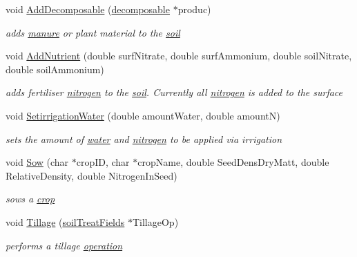 \begin{DoxyCompactItemize}
void \hyperlink{classpatch_interface_class_a5477552c0a1821f3f40e0bb3c96c7f8a}{AddDecomposable} (\hyperlink{classdecomposable}{decomposable} $\ast$produc)
\begin{DoxyCompactList}\small\item\em adds \hyperlink{classmanure}{manure} or plant material to the \hyperlink{classsoil}{soil} \item\end{DoxyCompactList}\item 
void \hyperlink{classpatch_interface_class_a9d183a51a7e9855ea13223c52b2ea3da}{AddNutrient} (double surfNitrate, double surfAmmonium, double soilNitrate, double soilAmmonium)
\begin{DoxyCompactList}\small\item\em adds fertiliser \hyperlink{classnitrogen}{nitrogen} to the \hyperlink{classsoil}{soil}. Currently all \hyperlink{classnitrogen}{nitrogen} is added to the surface \item\end{DoxyCompactList}\item 
void \hyperlink{classpatch_interface_class_a5f6d5f6deb20dd2acc8b39f581312541}{SetirrigationWater} (double amountWater, double amountN)
\begin{DoxyCompactList}\small\item\em sets the amount of \hyperlink{classwater}{water} and \hyperlink{classnitrogen}{nitrogen} to be applied via irrigation \item\end{DoxyCompactList}\item 
void \hyperlink{classpatch_interface_class_a1d4ab5a278d6663260d75d2c3c7ddb6b}{Sow} (char $\ast$cropID, char $\ast$cropName, double SeedDensDryMatt, double RelativeDensity, double NitrogenInSeed)
\begin{DoxyCompactList}\small\item\em sows a \hyperlink{classcrop}{crop} \item\end{DoxyCompactList}\item 
void \hyperlink{classpatch_interface_class_aa66072c455d76167fca0bc714f870997}{Tillage} (\hyperlink{classsoil_treat_fields}{soilTreatFields} $\ast$TillageOp)
\begin{DoxyCompactList}\small\item\em performs a tillage \hyperlink{classoperation}{operation} \item\end{DoxyCompactList}\item 

\end{DoxyCompactItemize}
